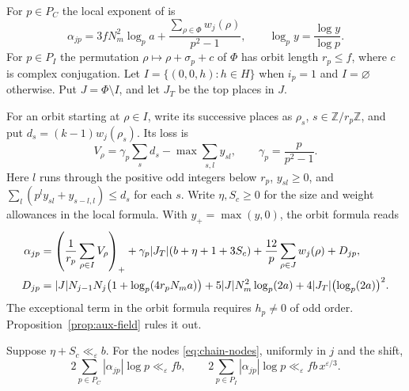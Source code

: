 For $p\in P_C$ the local exponent of
\citep[definition of \texttt{EatC}]{alpoge-finite-exponents} is
\begin{equation}\label{eq:finite-inert-c}
 \alpha_{jp}=3fN_m^2\log_p a+
                  \frac{\sum_{\rho\in\Phi}w_j(\rho)}{p^2-1},
 \qquad \log_p y=\frac{\log y}{\log p}.
\end{equation}
For $p\in P_I$ the permutation $\rho\mapsto\rho+\sigma_p+c$ of $\Phi$
has orbit length $r_p\le f$, where $c$ is complex conjugation. Let
$I=\{(0,0,h):h\in H\}$ when $i_p=1$ and $I=\varnothing$ otherwise.
Put $J=\Phi\setminus I$, and let $J_T$ be the top places in $J$.

For an orbit starting at $\rho\in I$, write its successive places as
$\rho_s$, $s\in\mathbb Z/r_p\mathbb Z$, and put
$d_s=(k-1)w_j(\rho_s)$. Its loss is
\[
 V_\rho=\gamma_p\sum_s d_s-\max\sum_{s,l} y_{sl},
 \qquad \gamma_p=\frac p{p^2-1}.
\]
Here $l$ runs through the positive odd integers below $r_p$,
$y_{sl}\ge0$, and $\sum_l(p^ly_{sl}+y_{s-l,l})\le d_s$ for each $s$.
Write $\eta,S_c\ge0$ for the size and weight allowances in the local
formula. With $y_+=\max(y,0)$, the orbit formula
\citep[definitions of \texttt{EatI} and \texttt{EatX}]{alpoge-finite-exponents} reads
\begin{align}
 \alpha_{jp}
 &=\left(\frac1{r_p}\sum_{\rho\in I}V_\rho\right)_+
     +\gamma_p|J_T|(b+\eta+1+3S_c)
     +\frac{12}{p}\sum_{\rho\in J}w_j(\rho)+D_{jp},\label{eq:finite-inert-i}\\
 D_{jp}
 &= |J|N_{j-1}N_j\bigl(1+\log_p(4r_pN_ma)\bigr)
      +5|J|N_m^2\log_p(2a)+4|J_T|\bigl(\log_p(2a)\bigr)^2 .\notag
\end{align}
The exceptional term in the orbit formula requires $h_p\ne0$ of odd
order. Proposition~\ref{prop:aux-field} rules it out.

\begin{lemma}\label{lem:finite-inert}
Suppose $\eta+S_c\ll_\varepsilon b$.
For the nodes \eqref{eq:chain-nodes}, uniformly in $j$ and the shift,
\[
 2\sum_{p\in P_C}|\alpha_{jp}|\log p\ll_\varepsilon fb,\qquad
 2\sum_{p\in P_I}|\alpha_{jp}|\log p\ll_\varepsilon fb\,x^{\varepsilon/3}.
\]
\end{lemma}


